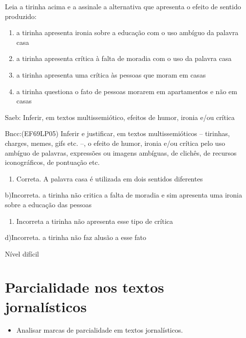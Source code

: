 {Leia a tirinha acima e a assinale a alternativa que apresenta o efeito
de sentido produzido:

\begin{enumerate}
\def\labelenumi{\alph{enumi})}
\item
  a tirinha apresenta ironia sobre a educação com o uso ambíguo da
  palavra casa
\item
  a tirinha apresenta crítica à falta de moradia com o uso da palavra
  casa
\item
  a tirinha apresenta uma crítica às pessoas que moram em casas
\item
  a tirinha questiona o fato de pessoas morarem em apartamentos e não em
  casas
\end{enumerate}

Saeb: Inferir, em textos multissemiótico, efeitos de humor, ironia e/ou
crítica

Bncc:(EF69LP05) Inferir e justificar, em textos multissemióticos --
tirinhas, charges, memes, gifs etc. --, o efeito de humor, ironia e/ou
crítica pelo uso ambíguo de palavras, expressões ou imagens ambíguas, de
clichês, de recursos iconográficos, de pontuação etc.

\begin{enumerate}
\def\labelenumi{\arabic{enumi}.}
\tightlist
\item
  Correta. A palavra casa é utilizada em dois sentidos diferentes
\end{enumerate}

b)Incorreta. a tirinha não critica a falta de moradia e sim apresenta
uma ironia sobre a educação das pessoas

\begin{enumerate}
\def\labelenumi{\arabic{enumi}.}
\tightlist
\item
  Incorreta a tirinha não apresenta esse tipo de crítica
\end{enumerate}

d)Incorreta. a tirinha não faz alusão a esse fato

Nível difícil


\chapter{Parcialidade nos textos jornalísticos}


\begin{itemize}

  \item Analisar marcas de parcialidade em textos jornalísticos.


\end{itemize}}
